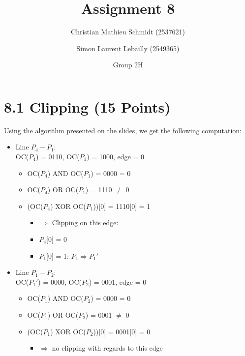 \documentclass{article}
\title{Assignment 8}
\author{Christian Mathieu Schmidt (2537621)
\and Simon Laurent Lebailly (2549365)\\
\and Group 2H}
\begin{document}
\maketitle


\section*{8.1 Clipping (15 Points)} \label{ex1}

Using the algorithm presented on the slides, we get the following computation:
\begin{itemize}
    \item Line $P_4 - P_1$:\\
    OC($P_4$) = 0110, OC($P_1$) = 1000, edge = 0
    \begin{itemize}
        \item OC($P_4$) AND OC($P_1$) = 0000 = 0
        \item OC($P_4$) OR OC($P_1$) = 1110 $\neq$ 0
        \item (OC($P_4$) XOR OC($P_1$))[0] = 1110[0] = 1
            \begin{itemize}
                \item[] $\Rightarrow$ Clipping on this edge:
                \item[] $P_4$[0] = 0
                \item[] $P_1$[0] = 1: $P_1 \Rightarrow P_1'$
            \end{itemize}
    \end{itemize}
    
    \item Line $P_1 - P_2$:\\
    OC($P_1'$) = 0000, OC($P_2$) = 0001, edge = 0
    \begin{itemize}
        \item OC($P_1$) AND OC($P_2$) = 0000 = 0
        \item OC($P_1$) OR OC($P_2$) = 0001 $\neq$ 0
        \item (OC($P_1$) XOR OC($P_2$))[0] = 0001[0] = 0
        \begin{itemize}
            \item[] $\Rightarrow$ no clipping with regards to this edge
        \end{itemize}
    \end{itemize}
    

\end{itemize}
\end{document}
